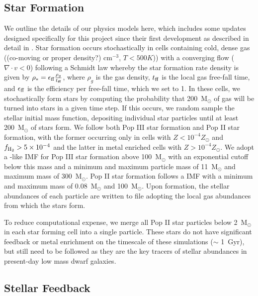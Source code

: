 \documentclass[12pt]{article} %
\begin{document}
\subsection{Star Formation}

We outline the details of our physics models here, which includes some updates designed specifically for this project since their first development as described in detail in \cite{Emerick2019a}. Star formation occurs stochastically in cells containing cold, dense gas ((co-moving or proper density?) cm$^{-3}$, $T < 500 K$)) with a converging flow ($\nabla \cdot v < 0$) following a Schmidt law whereby the star formation rate density is given by $\rho_* = \epsilon_{\rm ff} \frac{\rho_g}{t_{\rm ff}}$, where $\rho_g$ is the gas density, $t_{\rm ff}$ is the local gas free-fall time, and $\epsilon_{\rm ff}$ is the efficiency per free-fall time, which we set to 1. In these cells, we stochastically form stars by computing the probability that 200~M$_{\odot}$ of gas will be turned into stars in a given time step. If this occurs, we random sample the stellar initial mass function, depositing individual star particles until at least 200~M$_{\odot}$ of stars form. We follow both Pop III star formation and Pop II star formation, with the former occurring only in cells with $Z < 10^{-4} Z_{\odot}$ and $f_{\rm H_2} > 5\times 10^{-4}$ and the latter in metal enriched cells with $Z > 10^{-4} Z_{\odot}$. We adopt a \cite{Salpeter1955}-like IMF for Pop III star formation  above 100~M$_{\odot}$ with an exponential cutoff below this mass and a minimum and maximum particle mass of 11~M$_{\odot}$ and maximum mass of 300~M$_{\odot}$. Pop II star formation follows a \cite{Kroupa2001} IMF with a minimum and maximum mass of 0.08~M$_{\odot}$ and 100~M$_{\odot}$. Upon formation, the stellar abundances of each particle are written to file adopting the local gas abundances from which the stars form.

To reduce computational expense, we merge all Pop II star particles below 2~M$_{\odot}$ in each star forming cell into a single particle. These stars do not have significant feedback or metal enrichment on the timescale of these simulations ($\sim$ 1~Gyr), but still need to be followed as they are the key tracers of stellar abundances in present-day low mass dwarf galaxies.

\subsection{Stellar Feedback}
\end{document}

